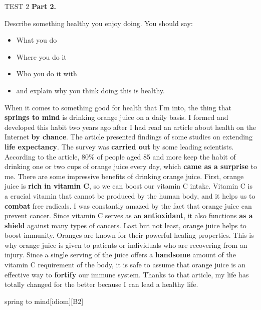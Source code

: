 \begin{glossarymc}[Cambridge 6]
\begin{test}{TEST 2}
    \noindent
    \textbf{Part 2.}
    \begin{qa}{Describe something healthy you enjoy doing. You should say:}
    \begin{itemize}
    \item What you do
    \item Where you do it
    \item Who you do it with
    \item and explain why you think doing this is healthy.
    \end{itemize}

    When it comes to something good for health that I'm into, the thing that \textbf{springs to mind} is drinking orange juice on a daily basis. I formed and developed this habit two years ago after I had read an article about health on the Internet \textbf{by chance}. The article presented findings of some studies on extending \textbf{life expectancy}. The survey was \textbf{carried out} by some leading scientists. According to the article, 80\% of people aged 85 and more keep the habit of drinking one or two cups of orange juice every day, which \textbf{came as a surprise} to me. There are some impressive benefits of drinking orange juice. First, orange juice is \textbf{rich in vitamin C}, so we can boost our vitamin C intake. Vitamin C is a crucial vitamin that cannot be produced by the human body, and it helps us to \textbf{combat} free radicals. I was constantly amazed by the fact that orange juice can prevent cancer. Since vitamin C serves as an \textbf{antioxidant}, it also functions \textbf{as a shield} against many types of cancers. Last but not least, orange juice helps to boost immunity. Oranges are known for their powerful healing properties. This is why orange juice is given to patients or individuals who are recovering from an injury. Since a single serving of the juice offers a \textbf{handsome} amount of the vitamin C requirement of the body, it is safe to assume that orange juice is an effective way to \textbf{fortify} our immune system. Thanks to that article, my life has totally changed for the better because I can lead a healthy life.
    \end{qa}

        \begin{VocabExplain}[Part 2]
            \begin{ExplainCard}{spring to mind}[idiom][B2]
            \end{ExplainCard}


\end{VocabExplain}
\end{test}
\end{glossarymc}
